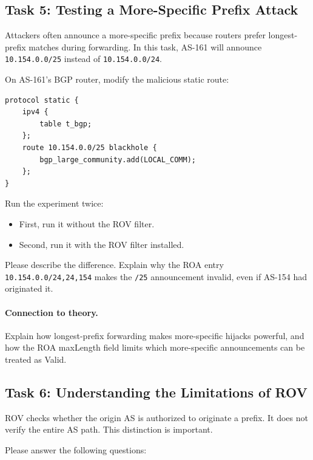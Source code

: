 \subsection{Task 5: Testing a More-Specific Prefix Attack}

Attackers often announce a more-specific prefix because routers prefer
longest-prefix matches during forwarding. In this task, AS-161 will announce
\texttt{10.154.0.0/25} instead of \texttt{10.154.0.0/24}.

On AS-161's BGP router, modify the malicious static route:

\begin{lstlisting}
protocol static {
    ipv4 {
        table t_bgp;
    };
    route 10.154.0.0/25 blackhole {
        bgp_large_community.add(LOCAL_COMM);
    };
}
\end{lstlisting}

Run the experiment twice:

\begin{itemize}[noitemsep]
\item First, run it without the ROV filter.
\item Second, run it with the ROV filter installed.
\end{itemize}

Please describe the difference. Explain why the ROA entry
\texttt{10.154.0.0/24,24,154} makes the \texttt{/25} announcement invalid,
even if AS-154 had originated it.

\paragraph{Connection to theory.}
Explain how longest-prefix forwarding makes more-specific hijacks powerful, and
how the ROA maxLength field limits which more-specific announcements can be
treated as Valid.


\subsection{Task 6: Understanding the Limitations of ROV}

ROV checks whether the origin AS is authorized to originate a prefix. It does
not verify the entire AS path. This distinction is important.

Please answer the following questions:

